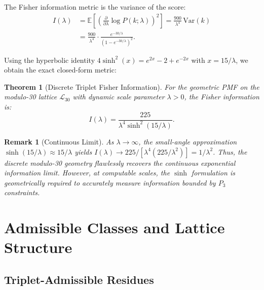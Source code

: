 \documentclass[11pt]{article}
\newtheorem{theorem}{Theorem}
\newtheorem{remark}{Remark}
\begin{document}
The Fisher information metric is the variance of the score:
\begin{align}
    I(\lambda) &= \mathbb{E}\left[\left(\frac{\partial}{\partial \lambda} \log P(k; \lambda)\right)^2\right] = \frac{900}{\lambda^4}\,\text{Var}(k) \nonumber\\
    &= \frac{900}{\lambda^4} \cdot \frac{e^{-30/\lambda}}{(1 - e^{-30/\lambda})^2}.
\end{align}

Using the hyperbolic identity $4\sinh^2(x) = e^{2x} - 2 + e^{-2x}$ with $x = 15/\lambda$, we obtain the exact closed-form metric:

\begin{theorem}[Discrete Triplet Fisher Information]
For the geometric PMF on the modulo-30 lattice $\mathcal{L}_{30}$ with dynamic scale parameter $\lambda > 0$, the Fisher information is:
\begin{equation}
    I(\lambda) = \frac{225}{\lambda^4 \sinh^2(15/\lambda)}.
\end{equation}
\end{theorem}

\begin{remark}[Continuous Limit]
As $\lambda \to \infty$, the small-angle approximation $\sinh(15/\lambda) \approx 15/\lambda$ yields $I(\lambda) \to 225/[\lambda^4 (225/\lambda^2)] = 1/\lambda^2$. Thus, the discrete modulo-30 geometry flawlessly recovers the continuous exponential information limit. However, at computable scales, the $\sinh$ formulation is geometrically required to accurately measure information bounded by $P_3$ constraints.
\end{remark}

\section{Admissible Classes and Lattice Structure}

\subsection{Triplet-Admissible Residues}
\end{document}
